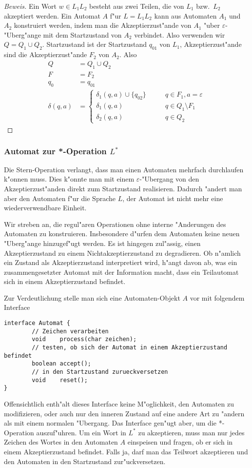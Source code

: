\begin{proof}[Beweis]
Ein Wort $w\in L_1L_2$ besteht aus zwei Teilen, die von $L_1$
bzw.~$L_2$ akzeptiert werden. Ein Automat $A$ f"ur $L=L_1L_2$
kann aus Automaten $A_1$ und $A_2$ konstruiert werden, indem man
die Akzeptierzust"ande von $A_1$ "uber $\varepsilon$-"Uberg"ange
mit dem Startzustand von $A_2$ verbindet. Also verwenden
wir $Q=Q_1\cup Q_2$.
Startzustand ist der Startzustand $q_{01}$ von $L_1$, Akzeptierzust"ande
sind die Akzeptierzust"ande $F_2$ von $A_2$. Also
\begin{align*}
Q&=Q_1\cup Q_2\\
F&=F_2\\
q_0&=q_{01}\\
\delta(q,a)&=\begin{cases}
\delta_1(q,a)\cup\{q_{02}\}&\qquad q\in F_1, a=\varepsilon\\
\delta_1(q,a)&\qquad q\in Q_1\setminus F_1\\
\delta_2(q,a)&\qquad q\in Q_2
\end{cases}
\end{align*}
\end{proof}

\subsubsection{Automat zur *-Operation $L^*$}
Die Stern-Operation verlangt, dass man einen Automaten mehrfach
durchlaufen k"onnen muss.
Dies k"onnte man mit einem $\varepsilon$-"Ubergang
von den Akzeptierzust"anden direkt zum Startzustand realisieren.
Dadurch "andert man aber den Automaten f"ur die Sprache $L$,
der Automat ist nicht mehr eine wiederverwendbare Einheit.

Wir streben an, die regul"aren Operationen ohne interne "Anderungen
des Automaten zu konstruieren.
Insbesondere d"urfen dem Automaten keine neuen "Uberg"ange hinzugef"ugt
werden.
Es ist hingegen zul"assig, einen Akzeptierzustand zu einem
Nichtakzeptierzustand zu degradieren.
Ob n"amlich ein Zustand als Akzeptierzustand interpretiert wird,
h"angt davon ab, was ein zusammengesetzter Automat mit der Information
macht, dass ein Teilautomat sich in einem Akzeptierzustand befindet.

Zur Verdeutlichung stelle man sich eine Automaten-Objekt $A$ vor mit
folgendem Interface
\begin{verbatim}
interface Automat {
        // Zeichen verarbeiten
        void    process(char zeichen);
        // testen, ob sich der Automat in einem Akzeptierzustand befindet
        boolean accept();
        // in den Startzustand zurueckversetzen
        void    reset();
}
\end{verbatim}
Offensichtlich enth"alt dieses Interface keine M"oglichkeit, den Automaten
zu modifizieren, oder auch nur den inneren Zustand auf eine andere Art
zu "andern als mit einem normalen "Ubergang.
Das Interface gen"ugt aber, um die *-Operation auszuf"uhren.
Um ein Wort in $L^*$ zu akzeptieren, muss man nur jedes Zeichen
des Wortes in den Automaten $A$ einspeisen und fragen, ob er sich
in einem Akzeptierzustand befindet. Falls ja, darf man das Teilwort
akzeptieren und den Automaten in den Startzustand zur"uckversetzen.

